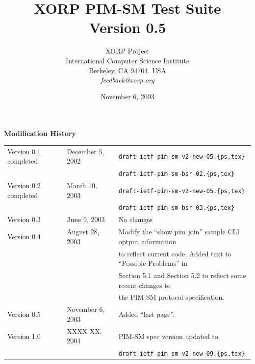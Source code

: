 \documentclass[11pt]{report}
\begin{document}
\title{XORP PIM-SM Test Suite \\
\vspace{1ex}
Version 0.5}
\author{ XORP Project                                   \\
         International Computer Science Institute       \\
         Berkeley, CA 94704, USA                        \\
         {\it feedback@xorp.org}
}
\date{November 6, 2003}

\maketitle

\thispagestyle{empty}


\newpage
\thispagestyle{empty}
{\huge \bf Modification History}
\vspace{4ex}

\begin{tabular}{lll}
Version 0.1 completed	& December 5, 2002 & \verb=draft-ietf-pim-sm-v2-new-05.{ps,tex}= \\
			&		   & \verb=draft-ietf-pim-sm-bsr-02.{ps,tex}= \\
Version 0.2 completed	& March 10, 2003 & \verb=draft-ietf-pim-sm-v2-new-05.{ps,tex}= \\
			&		   & \verb=draft-ietf-pim-sm-bsr-03.{ps,tex}= \\
Version 0.3		& June 9, 2003	   & No changes \\
Version 0.4		& August 28, 2003  & Modify the ``show pim join''
			sample CLI optput information \\
			&		   & to reflect current code. Added
			text to ``Possible Problems'' in \\
			&		   & Section 5.1 and Section 5.2 to
			reflect some recent changes to \\
			&		   & the PIM-SM protocol
			specification. \\
Version 0.5		& November 6, 2003 & Added ``last page''. \\
Version 1.0		& XXXX XX, 2004	   & PIM-SM spec version updated to\\
			&		   & \verb=draft-ietf-pim-sm-v2-new-09.{ps,tex}=.
\end{tabular}

\tableofcontents
\listoftables
\listoffigures
\end{document}

